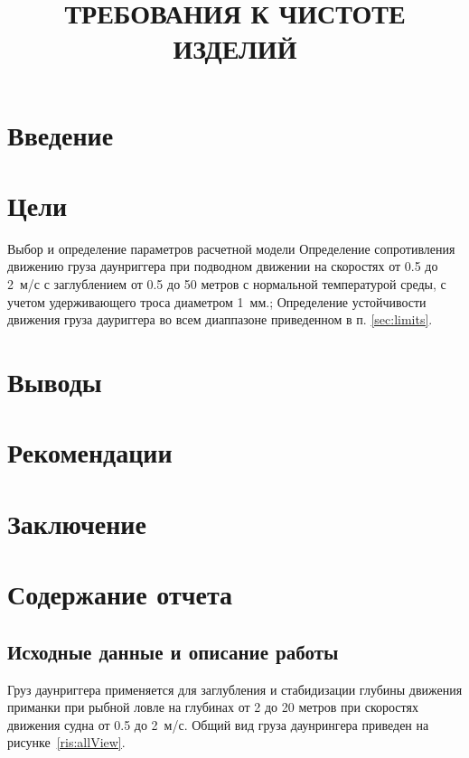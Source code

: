 \documentclass[russian,utf8, pointsubsection]{eskdtext}
\title{ТРЕБОВАНИЯ К ЧИСТОТЕ ИЗДЕЛИЙ}
\begin{document}

\maketitle


\tableofcontents

\newpage
\section{Введение}
\section{Цели}
\pointsection Выбор и определение параметров расчетной модели
\pointsection \label{sec:limits} Определение сопротивления движению груза даунриггера при подводном движении на скоростях от 0.5 до 2~м/с с заглублением от 0.5 до 50 метров с нормальной температурой среды, с учетом удерживающего троса диаметром 1~мм.;
\pointsection Определение устойчивости движения груза дауриггера во всем диаппазоне приведенном в п. \ref{sec:limits}.

\section{Выводы}
\section{Рекомендации}
\section{Заключение}
\section{Содержание отчета}
\subsection{Исходные данные и описание работы}

Груз даунриггера применяется для заглубления и стабидизации глубины движения приманки при рыбной ловле на глубинах от 2 до 20 метров при скоростях движения судна  от 0.5 до 2~м/с. Общий вид груза даунрингера приведен на рисунке~\ref{ris:allView}.
\end{document}
